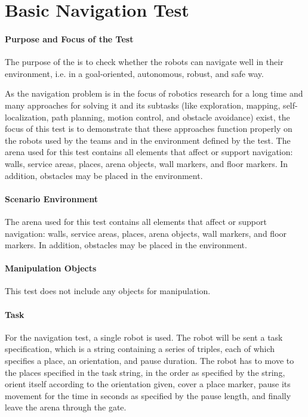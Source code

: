 \newpage
\section{Basic Navigation Test}

\paragraph{Purpose and Focus of the Test}
The purpose of the  is to check whether the robots can navigate well in their environment, i.e. in a goal-oriented, autonomous, robust, and safe way.
\par
As the navigation problem is in the focus of robotics research for a long time and many approaches for solving it and its subtasks (like exploration, mapping, self-localization, path planning, motion control, and obstacle avoidance) exist, the focus of this test is to demonstrate that these approaches function properly on the robots used by the teams and in the environment defined by the test.
The arena used for this test contains all elements that affect or support navigation: walls, service areas, places, arena objects, wall markers, and floor markers. In addition, obstacles may be placed in the environment.
\par

\paragraph{Scenario Environment}
The arena used for this test contains all elements that affect or support navigation: walls, service areas, places, arena objects, wall markers, and floor markers. In addition, obstacles may be placed in the environment.

\paragraph{Manipulation Objects}
This test does not include any objects for manipulation.
\paragraph{Task}
For the navigation test, a single robot is used. The robot will be sent a task specification, which is a string containing a series of triples, each of which specifies a place, an orientation, and pause duration. The robot has to move to the places specified in the task string, in the order as specified by the string, orient itself according to the orientation given, cover a place marker, pause its movement for the time in seconds as specified by the pause length, and finally leave the arena through the gate.

